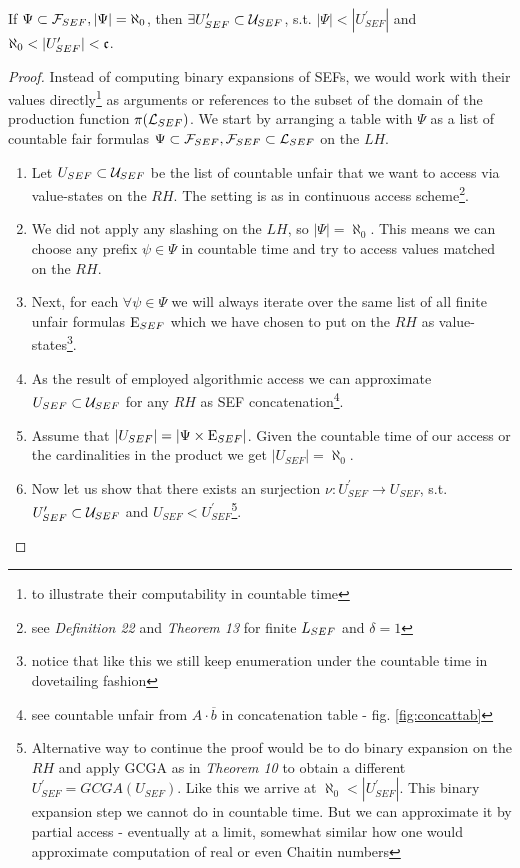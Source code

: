 \begin{theorem}\label{wt_not_ch}
  If $\Psi \subset \mathcal{F}_{SEF}, |\Psi| = \aleph_0$, then $\exists U^\prime_{SEF} \subset \mathcal{U}_{SEF}$, s.t. $|\Psi| < |U^\prime_{SEF}|$ and $\aleph_0 < |U^\prime_{SEF}| < \mathfrak{c}$.
\end{theorem}
\begin{proof}
  Instead of computing binary expansions of SEFs, we would work with their values directly\footnote{to illustrate their computability in countable time} as arguments or references to the subset of the domain of the production function $\pi(\mathcal{L}_{SEF})$. We start by arranging a table with $\Psi$ as a list of countable fair formulas $\Psi \subset \mathcal{F}_{SEF}, \mathcal{F}_{SEF} \subset \mathcal{L}_{SEF}$ on the $LH$.
  \begin{enumerate}
    \item Let $U_{SEF} \subset \mathcal{U}_{SEF}$ be the list of countable unfair that we want to access via value-states on the $RH$. The setting is as in continuous access scheme\footnote{see \textit{Definition 22} and \textit{Theorem 13} for finite $L_{SEF}$ and $\delta = 1$}.
    \item We did not apply any slashing on the $LH$, so $|\Psi| = \aleph_0$. This means we can choose any prefix $\psi \in \Psi$ in countable time and try to access values matched on the $RH$.
    \item Next, for each $\forall \psi \in \Psi$ we will always iterate over the same list of all finite unfair formulas $\mathrm{E}_{SEF}$ which we have chosen to put on the $RH$ as value-states\footnote{notice that like this we still keep enumeration under the countable time in dovetailing fashion}.
    \item As the result of employed algorithmic access we can approximate $U_{SEF} \subset \mathcal{U}_{SEF}$ for any $RH$ as SEF concatenation\footnote{see countable unfair from $A \cdot \overline{b}$ in concatenation table - fig. \ref{fig:concattab}}.
    \item Assume that $|U_{SEF}| = |\Psi \times \mathrm{E}_{SEF}|$. Given the countable time of our access or the cardinalities in the product we get $|U_{SEF}| = \aleph_0$.
    \item Now let us show that there exists an surjection $\nu: U^\prime_{SEF} \to U_{SEF}$, s.t. $U^\prime_{SEF} \subset \mathcal{U}_{SEF}$ and $U_{SEF} < U^\prime_{SEF}$\footnote{Alternative way to continue the proof would be to do binary expansion on the $RH$ and apply GCGA as in \textit{Theorem 10} to obtain a different $U^\prime_{SEF} = GCGA(U_{SEF})$. Like this we arrive at $\aleph_0 < |U^\prime_{SEF}|$. This binary expansion step we cannot do in countable time. But we can approximate it by partial access - eventually at a limit, somewhat similar how one would approximate computation of real or even Chaitin numbers}.

\end{enumerate}
\end{proof}

